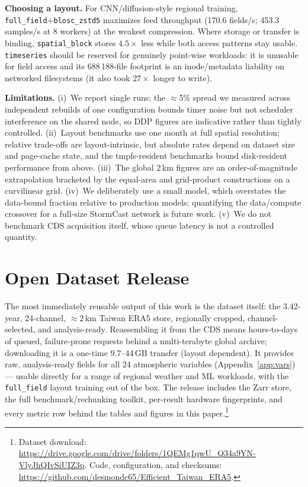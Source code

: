 \documentclass[conference]{IEEEtran}
\begin{document}
\textbf{Choosing a layout.} For CNN/diffusion-style regional training,
\texttt{full\_field}+\texttt{blosc\_zstd5} maximizes feed throughput (170.6
fields/s; 453.3 samples/s at 8 workers) at the weakest compression. Where
storage or transfer is binding, \texttt{spatial\_block} stores $4.5\times$
less while both access patterns stay usable. \texttt{timeseries} should be
reserved for genuinely point-wise workloads: it is unusable for field access
and its 688\,188-file footprint is an inode/metadata liability on networked
filesystems (it also took $27\times$ longer to write).

\textbf{Limitations.} (i)~We report single runs; the $\approx$5\% spread we
measured across independent rebuilds of one configuration bounds timer noise
but not scheduler interference on the shared node, so DDP figures are
indicative rather than tightly controlled. (ii)~Layout benchmarks use one
month at full spatial resolution; relative trade-offs are layout-intrinsic,
but absolute rates depend on dataset size and page-cache state, and the
tmpfs-resident benchmarks bound disk-resident performance from above.
(iii)~The global 2\,km figures are an order-of-magnitude extrapolation
bracketed by the equal-area and grid-product constructions on a curvilinear
grid. (iv)~We deliberately use a small model, which overstates the data-bound
fraction relative to production models; quantifying the data/compute
crossover for a full-size StormCast network is future work. (v)~We do not
benchmark CDS acquisition itself, whose queue latency is not a controlled
quantity.

\section{Open Dataset Release}\label{sec:release}
The most immediately reusable output of this work is the dataset itself: the
3.42-year, 24-channel, $\approx$2\,km Taiwan ERA5 store, regionally cropped,
channel-selected, and analysis-ready. Reassembling it from the CDS means
hours-to-days of queued, failure-prone requests behind a multi-terabyte
global archive; downloading it is a one-time 9.7--44\,GB transfer (layout
dependent). It provides raw, analysis-ready fields for all 24 atmospheric
variables (Appendix~\ref{app:vars}) --- usable directly for a range of
regional weather and ML workloads, with the \texttt{full\_field} layout
training out of the box. The release includes the Zarr store, the full
benchmark/rechunking toolkit, per-result hardware fingerprints, and every
metric row behind the tables and figures in this
paper.\footnote{Dataset download:
\url{https://drive.google.com/drive/folders/1QEMg1qwU_Q34a9YN-VlyJhQIvSiUIZ3p}.
Code, configuration, and checksums:
\url{https://github.com/desmondc65/Efficient_Taiwan_ERA5}.}
\end{document}

